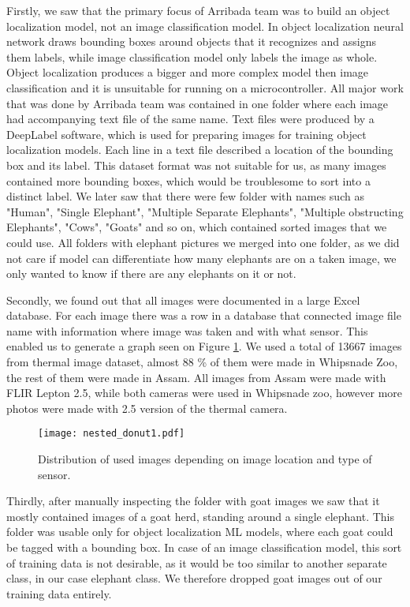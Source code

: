 Firstly, we saw that the primary focus of Arribada team was to build an object localization model, not an image classification model.
In object localization neural network draws bounding boxes around objects that it recognizes and assigns them labels, while image classification model only labels the image as whole.
Object localization produces a bigger and more complex model then image classification and it is unsuitable for running on a microcontroller.
All major work that was done by Arribada team was contained in one folder where each image had accompanying text file of the same name.
Text files were produced by a DeepLabel software, which is used for preparing images for training object localization models.
Each line in a text file described a location of the bounding box and its label.
This dataset format was not suitable for us, as many images contained more bounding boxes, which would be troublesome to sort into a distinct label.
We later saw that there were few folder with names such as "Human", "Single Elephant", "Multiple Separate Elephants", "Multiple obstructing Elephants", "Cows", "Goats" and so on, which contained sorted images that we could use.
All folders with elephant pictures we merged into one folder, as we did not care if model can differentiate how many elephants are on a taken image, we only wanted to know if there are any elephants on it or not.

Secondly, we found out that all images were documented in a large Excel database.
For each image there was a row in a database that connected image file name with information where image was taken and with what sensor.
This enabled us to generate a graph seen on Figure \ref{nested_donut1}.
We used a total of 13667 images from thermal image dataset, almost 88 \% of them were made in Whipsnade Zoo, the rest of them were made in Assam.
All images from Assam were made with FLIR Lepton 2.5, while both cameras were used in Whipsnade zoo, however more photos were made with 2.5 version of the thermal camera.

\begin{figure}[ht]
    \centering
    \texttt{[image: nested\_donut1.pdf]} 
    \caption{Distribution of used images depending on image location and type of sensor.}
    \label{nested_donut1}
\end{figure}

Thirdly, after manually inspecting the folder with goat images we saw that it mostly contained images of a goat herd, standing around a single elephant.
This folder was usable only for object localization ML models, where each goat could be tagged with a bounding box. 
In case of an image classification model, this sort of training data is not desirable, as it would be too similar to another separate class, in our case elephant class.
We therefore dropped goat images out of our training data entirely.

